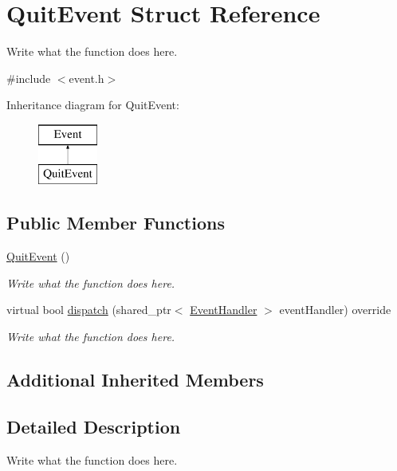 \hypertarget{structQuitEvent}{\section{Quit\+Event Struct Reference}
\label{structQuitEvent}
}


Write what the function does here.  




{\ttfamily \#include $<$event.\+h$>$}

Inheritance diagram for Quit\+Event\+:\begin{figure}[H]
\begin{center}
\leavevmode
\includegraphics[height=2.000000cm]{structQuitEvent}
\end{center}
\end{figure}
\subsection*{Public Member Functions}
\begin{DoxyCompactItemize}
\item 
\hyperlink{structQuitEvent_acde25804dff366bbade69c20597ebe32}{Quit\+Event} ()
\begin{DoxyCompactList}\small\item\em Write what the function does here. \end{DoxyCompactList}\item 
virtual bool \hyperlink{structQuitEvent_ac008fb404abe76e5a79741b61e59c37c}{dispatch} (shared\+\_\+ptr$<$ \hyperlink{structEventHandler}{Event\+Handler} $>$ event\+Handler) override
\begin{DoxyCompactList}\small\item\em Write what the function does here. \end{DoxyCompactList}\end{DoxyCompactItemize}
\subsection*{Additional Inherited Members}


\subsection{Detailed Description}
Write what the function does here. 

